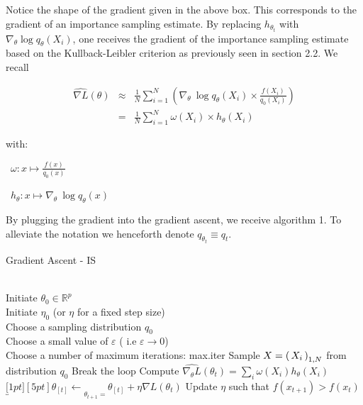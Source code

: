 Notice the shape of the gradient given in the above box. This corresponds to the gradient of an importance sampling estimate. By replacing $h_{\theta_t}$ with $\nabla_\theta \log q_{\theta}(X_i)$, one receives the gradient of the importance sampling estimate based on the Kullback-Leibler criterion  as previously seen in section 2.2. We recall

$$
\begin{array}{rcl}
\widehat{\nabla L}(\theta) 
&\approx& 
\frac 1 N \displaystyle\sum\limits_{i = 1}^N \left( \nabla_\theta \ \log q_\theta (X_i) \times \frac{f(X_i)}{q_0(X_i)}\right)
\\
&=& \frac 1 N \displaystyle\sum_{i = 1}^N \omega(X_i) \times h_\theta(X_i)
\end{array}
$$

with:

\faAngleRight \ $\omega: x \mapsto \frac{f(x)}{q_0(x)}$

\faAngleRight \ $h_\theta: x \mapsto \nabla_\theta \ \log q_\theta(x)$

By plugging the gradient into the gradient ascent, we receive algorithm 1. To alleviate the notation we henceforth denote $q_{\theta_t} \equiv q_t$. 


\begin{algorithm}[H]
\caption{Gradient Ascent - IS}\label{alg:gaIS}
\begin{algorithmic}
    \Require 
    \\ \ra Initiate $\theta_0 \in \mathbb R^p$ 
    \\ \ra Initiate $\eta_0$ (or $\eta$ for a fixed step size) 
    \\ \ra Choose a sampling distribution $q_0$
    \\ \ra Choose a small value of $\varepsilon$ ( i.e $\varepsilon \rightarrow 0 $)
    \\ \ra Choose a number of maximum iterations: max.iter
    \State Sample $X = \left( \, {X} _ {i} \, \right)_{1, N}$ from distribution $q_0$ 
            \State Break the loop
        \EndIf
        \State \ra Compute $\widehat{\nabla_\theta L}(\theta_t) = \displaystyle\sum\limits_i\omega(X_i) h_\theta(X_i)$
        \State \ra $\underbracket[1pt][5pt]{\theta_{[t]} \gets}_{\theta_{t+1} = } \theta_{[t]} + \eta \nabla L(\theta_t)$
        \State \ra Update $\eta$ such that $f(x_{t+1}) > f(x_t)$ 
    \EndFor  
\end{algorithmic}
\end{algorithm}

